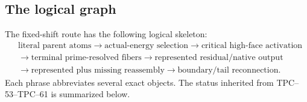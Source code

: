 \subsection{The logical graph}

The fixed-shift route has the following logical skeleton:
\begin{equation}
\begin{aligned}
&\text{literal parent atoms}
 \longrightarrow \text{actual-energy selection}
 \longrightarrow \text{critical high-face activation}\\
&\longrightarrow \text{terminal prime-resolved fibers}
 \longrightarrow \text{represented residual/native output}\\
&\longrightarrow \text{represented plus missing reassembly}
 \longrightarrow \text{boundary/tail reconnection}.
\end{aligned}
\label{eq:tpc62-logical-skeleton}
\end{equation}
Each phrase abbreviates several exact objects.  The status inherited from
TPC--53--TPC--61 is summarized below.

